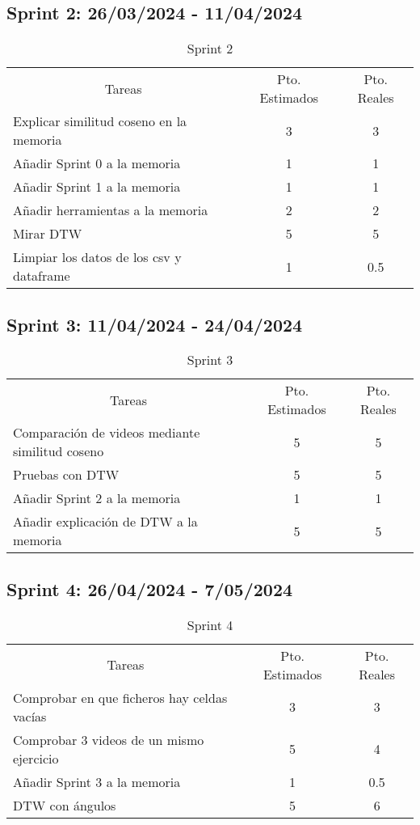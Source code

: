 \subsection{Sprint 2: 26/03/2024 - 11/04/2024}
\begin{table}[H]
	\begin{tabular}{lcc}
		\multicolumn{1}{c}{Tareas} & Pto. Estimados & Pto. Reales\\
		Explicar similitud coseno en la memoria & 3 & 3 \\
		Añadir Sprint 0 a la memoria & 1 & 1 \\
		Añadir Sprint 1 a la memoria & 1 & 1 \\
		Añadir herramientas a la memoria & 2 & 2 \\
		Mirar DTW & 5 & 5 \\
		Limpiar los datos de los csv y dataframe & 1 & 0.5 \\

	\end{tabular}
	\caption{Sprint 2}
	\label{sprint2}
\end{table}

\subsection{Sprint 3: 11/04/2024 - 24/04/2024}
\begin{table}[H]
	\begin{tabular}{lcc}
		\multicolumn{1}{c}{Tareas} & Pto. Estimados & Pto. Reales\\
		Comparación de videos mediante similitud coseno & 5 & 5 \\
		Pruebas con DTW & 5 & 5 \\
		Añadir Sprint 2 a la memoria & 1 & 1 \\
		Añadir explicación de DTW a la memoria & 5 & 5 \\
	\end{tabular}
	\caption{Sprint 3}
	\label{sprint3}
\end{table}

\subsection{Sprint 4: 26/04/2024 - 7/05/2024}
\begin{table}[H]
	\begin{tabular}{lcc}
		\multicolumn{1}{c}{Tareas} & Pto. Estimados & Pto. Reales\\
		Comprobar en que ficheros hay celdas vacías & 3 & 3 \\
		Comprobar 3 videos de un mismo ejercicio & 5 & 4 \\
		Añadir Sprint 3 a la memoria & 1 & 0.5 \\
	    DTW con ángulos& 5 & 6 \\
	\end{tabular}
	\caption{Sprint 4}
	\label{sprint4}
\end{table}

